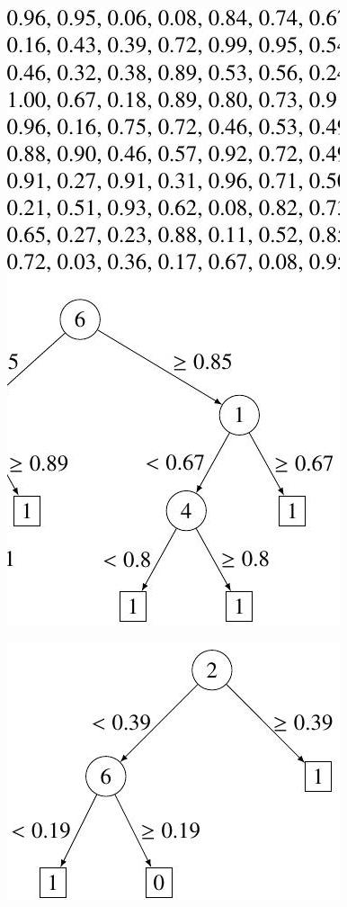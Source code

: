 \documentclass[10pt]{article}
\begin{document}
\includegraphics[max width=\textwidth]{2022_02_02_1af495ea60fb42b668bfg-08}

\includegraphics[max width=\textwidth]{2022_02_02_1af495ea60fb42b668bfg-08(1)}
\end{document}
